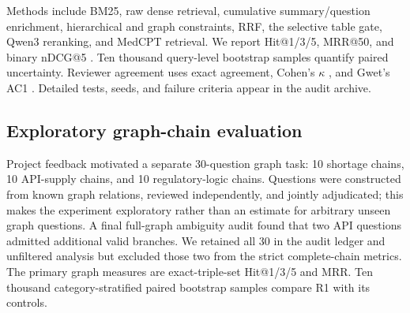Methods include BM25, raw dense retrieval, cumulative summary/question enrichment, hierarchical and graph constraints, RRF, the selective table gate, Qwen3 reranking, and MedCPT retrieval. We report Hit@1/3/5, MRR@50, and binary nDCG@5 \cite{jarvelin2002ndcg}. Ten thousand query-level bootstrap samples quantify paired uncertainty. Reviewer agreement uses exact agreement, Cohen's $\kappa$ \cite{cohen1960kappa}, and Gwet's AC1 \cite{gwet2008ac1}. Detailed tests, seeds, and failure criteria appear in the audit archive.

\subsection{Exploratory graph-chain evaluation}

Project feedback motivated a separate 30-question graph task: 10 shortage chains, 10 API-supply chains, and 10 regulatory-logic chains. Questions were constructed from known graph relations, reviewed independently, and jointly adjudicated; this makes the experiment exploratory rather than an estimate for arbitrary unseen graph questions. A final full-graph ambiguity audit found that two API questions admitted additional valid branches. We retained all 30 in the audit ledger and unfiltered analysis but excluded those two from the strict complete-chain metrics. The primary graph measures are exact-triple-set Hit@1/3/5 and MRR. Ten thousand category-stratified paired bootstrap samples compare R1 with its controls.
